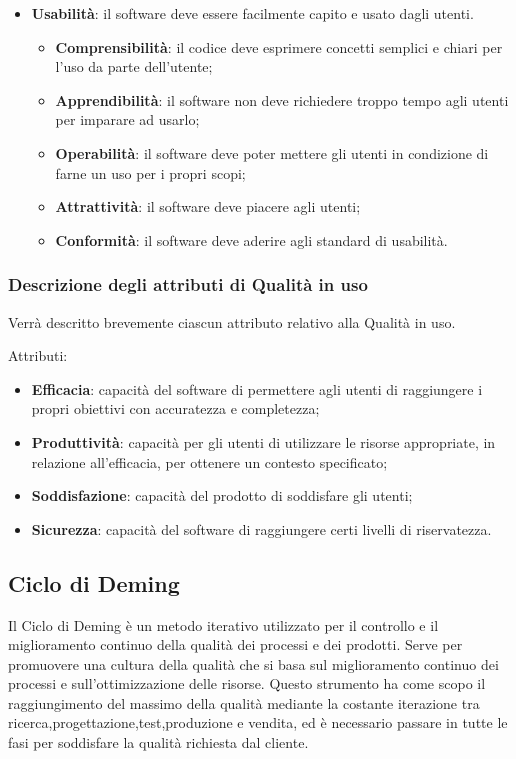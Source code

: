 \documentclass[../piano-di-qualifica.tex]{subfiles}
\begin{document}
\begin{itemize}
        \item \textbf{Usabilità}: il software deve essere facilmente capito e usato dagli utenti.
        \begin{itemize}
            \item \textbf{Comprensibilità}: il codice deve esprimere concetti semplici e chiari per l'uso da parte dell'utente;
            \item \textbf{Apprendibilità}: il software non deve richiedere troppo tempo agli utenti per imparare ad usarlo;
            \item \textbf{Operabilità}: il software deve poter mettere gli utenti in condizione di farne un uso per i propri scopi;
            \item \textbf{Attrattività}: il software deve piacere agli utenti;
            \item \textbf{Conformità}: il software deve aderire agli standard di usabilità.
        \end{itemize}
\end{itemize}


\subsubsection{Descrizione degli attributi di Qualità in uso}%
\label{sec:descrizione_attributi_in_uso}
Verrà descritto brevemente ciascun attributo relativo alla Qualità in uso.

Attributi:
\begin{itemize}
    \item \textbf{Efficacia}: capacità del software di permettere agli utenti di raggiungere i propri obiettivi con accuratezza e completezza;
    \item \textbf{Produttività}: capacità per gli utenti di utilizzare le risorse appropriate, in relazione all'efficacia, per ottenere un contesto specificato;
    \item \textbf{Soddisfazione}: capacità del prodotto di soddisfare gli utenti;
    \item \textbf{Sicurezza}: capacità del software di raggiungere certi livelli di riservatezza.
\end{itemize}

\subsection{Ciclo di Deming}%
\label{sec:ciclo_di_deming}
Il Ciclo di Deming è un metodo iterativo utilizzato per il controllo e il miglioramento continuo della qualità dei processi e dei prodotti.
Serve per promuovere una cultura della qualità che si basa sul miglioramento continuo dei processi e sull'ottimizzazione delle risorse.
Questo strumento ha come scopo il raggiungimento del massimo della qualità mediante la costante iterazione tra ricerca,progettazione,test,produzione e vendita, ed è necessario passare in tutte le fasi per soddisfare la qualità richiesta dal cliente.
\end{document}
